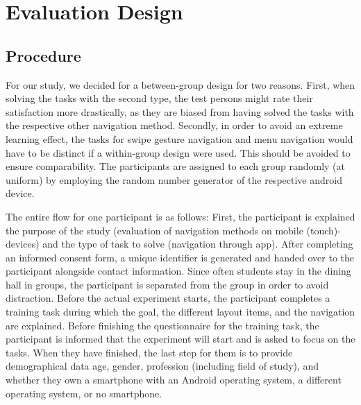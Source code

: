 \documentclass{sig-alternate-05-2015}
\begin{document}
\section{Evaluation Design}
\subsection{Procedure}
For our study, we decided for a between-group design for two reasons. First,
when solving the tasks with the second type, the test persons might rate their
satisfaction more drastically, as they are biased from having solved the tasks
with the respective other navigation method. Secondly, in order to avoid an
extreme learning effect, the tasks for swipe gesture navigation and menu
navigation would have to be distinct if a within-group design were used. This
should be avoided to ensure comparability. The participants are assigned to
each group randomly (at uniform) by employing the random number generator of
the respective android device.

The entire flow for one participant is as follows: First, the participant is explained
the purpose of the study (evaluation of navigation methods on mobile (touch)-devices) and the
type of task to solve (navigation through app). After completing an informed consent form, a unique
identifier is generated and handed over to the participant alongside contact information. Since often students
stay in the dining hall in groups, the participant is separated from the group in order to avoid distraction. 
Before the actual experiment starts, the participant completes a training task during which the goal, the
different layout items, and the navigation are explained. Before finishing the questionnaire for the training
task, the participant is informed that the experiment will start and is asked to focus on the tasks. When they have
finished, the last step for them is to provide demographical data age, gender, profession (including field of study),
and whether they own a smartphone with an Android operating system, a different operating system, or no smartphone.
\end{document}
